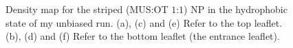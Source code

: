\begin{figure}[p]
{		}\\%
		\,%
	\caption{Density map for the striped (\acs{MUS}:\acs{OT} $1$:$1$) \acs{NP} in the hydrophobic state of my unbiased run. (a), (c) and (e) Refer to the top leaflet. (b), (d) and (f) Refer to the bottom leaflet (the entrance leaflet).}%
	\label{fig:stripedDensity}
\end{figure}
%

